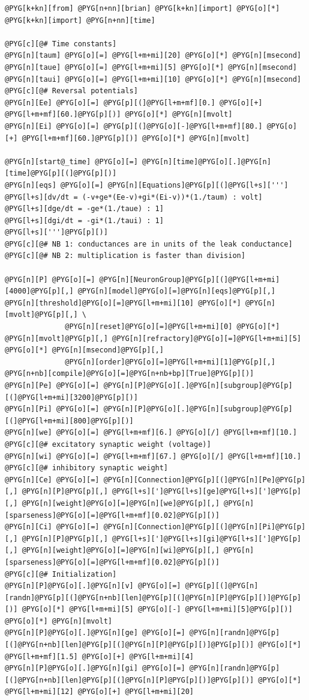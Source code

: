 \documentclass[letterpaper,10pt,english]{manual}
\begin{document}
\begin{Verbatim}[commandchars=@\[\]]
@PYG[k+kn][from] @PYG[n+nn][brian] @PYG[k+kn][import] @PYG[o][*]
@PYG[k+kn][import] @PYG[n+nn][time]

@PYG[c][@# Time constants]
@PYG[n][taum] @PYG[o][=] @PYG[l+m+mi][20] @PYG[o][*] @PYG[n][msecond]
@PYG[n][taue] @PYG[o][=] @PYG[l+m+mi][5] @PYG[o][*] @PYG[n][msecond]
@PYG[n][taui] @PYG[o][=] @PYG[l+m+mi][10] @PYG[o][*] @PYG[n][msecond]
@PYG[c][@# Reversal potentials]
@PYG[n][Ee] @PYG[o][=] @PYG[p][(]@PYG[l+m+mf][0.] @PYG[o][+] @PYG[l+m+mf][60.]@PYG[p][)] @PYG[o][*] @PYG[n][mvolt]
@PYG[n][Ei] @PYG[o][=] @PYG[p][(]@PYG[o][-]@PYG[l+m+mf][80.] @PYG[o][+] @PYG[l+m+mf][60.]@PYG[p][)] @PYG[o][*] @PYG[n][mvolt]

@PYG[n][start@_time] @PYG[o][=] @PYG[n][time]@PYG[o][.]@PYG[n][time]@PYG[p][(]@PYG[p][)]
@PYG[n][eqs] @PYG[o][=] @PYG[n][Equations]@PYG[p][(]@PYG[l+s][''']
@PYG[l+s][dv/dt = (-v+ge*(Ee-v)+gi*(Ei-v))*(1./taum) : volt]
@PYG[l+s][dge/dt = -ge*(1./taue) : 1]
@PYG[l+s][dgi/dt = -gi*(1./taui) : 1]
@PYG[l+s][''']@PYG[p][)]
@PYG[c][@# NB 1: conductances are in units of the leak conductance]
@PYG[c][@# NB 2: multiplication is faster than division]

@PYG[n][P] @PYG[o][=] @PYG[n][NeuronGroup]@PYG[p][(]@PYG[l+m+mi][4000]@PYG[p][,] @PYG[n][model]@PYG[o][=]@PYG[n][eqs]@PYG[p][,] @PYG[n][threshold]@PYG[o][=]@PYG[l+m+mi][10] @PYG[o][*] @PYG[n][mvolt]@PYG[p][,] \
              @PYG[n][reset]@PYG[o][=]@PYG[l+m+mi][0] @PYG[o][*] @PYG[n][mvolt]@PYG[p][,] @PYG[n][refractory]@PYG[o][=]@PYG[l+m+mi][5] @PYG[o][*] @PYG[n][msecond]@PYG[p][,]
              @PYG[n][order]@PYG[o][=]@PYG[l+m+mi][1]@PYG[p][,] @PYG[n+nb][compile]@PYG[o][=]@PYG[n+nb+bp][True]@PYG[p][)]
@PYG[n][Pe] @PYG[o][=] @PYG[n][P]@PYG[o][.]@PYG[n][subgroup]@PYG[p][(]@PYG[l+m+mi][3200]@PYG[p][)]
@PYG[n][Pi] @PYG[o][=] @PYG[n][P]@PYG[o][.]@PYG[n][subgroup]@PYG[p][(]@PYG[l+m+mi][800]@PYG[p][)]
@PYG[n][we] @PYG[o][=] @PYG[l+m+mf][6.] @PYG[o][/] @PYG[l+m+mf][10.] @PYG[c][@# excitatory synaptic weight (voltage)]
@PYG[n][wi] @PYG[o][=] @PYG[l+m+mf][67.] @PYG[o][/] @PYG[l+m+mf][10.] @PYG[c][@# inhibitory synaptic weight]
@PYG[n][Ce] @PYG[o][=] @PYG[n][Connection]@PYG[p][(]@PYG[n][Pe]@PYG[p][,] @PYG[n][P]@PYG[p][,] @PYG[l+s][']@PYG[l+s][ge]@PYG[l+s][']@PYG[p][,] @PYG[n][weight]@PYG[o][=]@PYG[n][we]@PYG[p][,] @PYG[n][sparseness]@PYG[o][=]@PYG[l+m+mf][0.02]@PYG[p][)]
@PYG[n][Ci] @PYG[o][=] @PYG[n][Connection]@PYG[p][(]@PYG[n][Pi]@PYG[p][,] @PYG[n][P]@PYG[p][,] @PYG[l+s][']@PYG[l+s][gi]@PYG[l+s][']@PYG[p][,] @PYG[n][weight]@PYG[o][=]@PYG[n][wi]@PYG[p][,] @PYG[n][sparseness]@PYG[o][=]@PYG[l+m+mf][0.02]@PYG[p][)]
@PYG[c][@# Initialization]
@PYG[n][P]@PYG[o][.]@PYG[n][v] @PYG[o][=] @PYG[p][(]@PYG[n][randn]@PYG[p][(]@PYG[n+nb][len]@PYG[p][(]@PYG[n][P]@PYG[p][)]@PYG[p][)] @PYG[o][*] @PYG[l+m+mi][5] @PYG[o][-] @PYG[l+m+mi][5]@PYG[p][)] @PYG[o][*] @PYG[n][mvolt]
@PYG[n][P]@PYG[o][.]@PYG[n][ge] @PYG[o][=] @PYG[n][randn]@PYG[p][(]@PYG[n+nb][len]@PYG[p][(]@PYG[n][P]@PYG[p][)]@PYG[p][)] @PYG[o][*] @PYG[l+m+mf][1.5] @PYG[o][+] @PYG[l+m+mi][4]
@PYG[n][P]@PYG[o][.]@PYG[n][gi] @PYG[o][=] @PYG[n][randn]@PYG[p][(]@PYG[n+nb][len]@PYG[p][(]@PYG[n][P]@PYG[p][)]@PYG[p][)] @PYG[o][*] @PYG[l+m+mi][12] @PYG[o][+] @PYG[l+m+mi][20]


\end{Verbatim}
\end{document}
